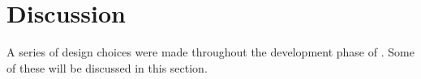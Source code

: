 













\section{Discussion}
\label{sec:discussion}
A series of design choices were made throughout the development phase of \projectname{}.
Some of these will be discussed in this section. \\

